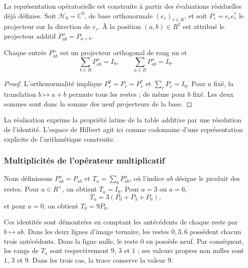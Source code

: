 La représentation opératorielle est construite à partir des évaluations résiduelles déjà définies. Soit $\mathcal H_9=\mathbb C^9$, de base orthonormale $(e_r)_{r\in R}$, et soit $P_r=e_re_r^*$ le projecteur sur la direction de $e_r$. À la position $(a,b)\in R^2$ est attribué le projecteur additif $P^+_{ab}=P_{a+b}$.

\begin{bloqueindivisible}
\begin{proposicion}
\label{prop:app-aditivo-operador}
Chaque entrée $P^+_{ab}$ est un projecteur orthogonal de rang un et
\begin{equation}
 \sum_{b\in R}P^+_{ab}=I_9,
 \qquad \sum_{a\in R}P^+_{ab}=I_9.
\end{equation}
\end{proposicion}

\begin{proof}
L'orthonormalité implique $P_r^2=P_r=P_r^*$ et $\sum_rP_r=I_9$. Pour $a$ fixé, la translation $b\mapsto a+b$ permute tous les restes ; de même pour $b$ fixé. Les deux sommes sont donc la somme des neuf projecteurs de la base.
\end{proof}
\end{bloqueindivisible}

La réalisation exprime la propriété latine de la table additive par une résolution de l'identité. L'espace de Hilbert agit ici comme codomaine d'une représentation explicite de l'arithmétique construite.

\subsubsection{Multiplicités de l'opérateur multiplicatif}

Nous définissons $P^\times_{ab}=P_{ab}$ et $T_a=\sum_bP^\times_{ab}$, où l'indice $ab$ désigne le produit des restes. Pour $a\in R^\times$, on obtient $T_a=I_9$. Pour $a=3$ ou $a=6$,
\begin{equation}
 T_a=3(P_0+P_3+P_6),
\end{equation}
et pour $a=0$, on obtient $T_0=9P_0$.

Ces identités sont démontrées en comptant les antécédents de chaque reste par $b\mapsto ab$. Dans les deux lignes d'image ternaire, les restes $0,3,6$ possèdent chacun trois antécédents. Dans la ligne nulle, le reste $0$ en possède neuf. Par conséquent, les rangs de $T_a$ sont respectivement $9$, $3$ et $1$ ; ses valeurs propres non nulles sont $1$, $3$ et $9$. Dans les trois cas, la trace conserve la valeur $9$.

